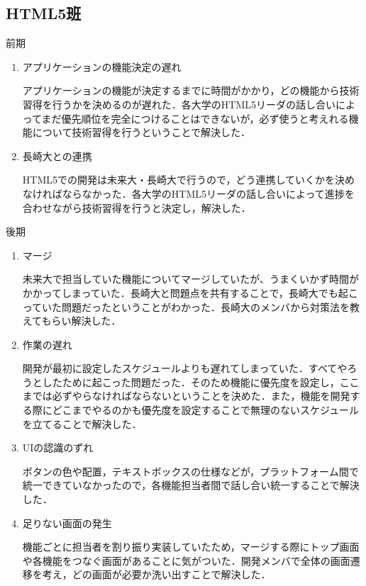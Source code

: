 \subsection{HTML5班}
前期
\\
\begin{enumerate}
\item アプリケーションの機能決定の遅れ
\par
アプリケーションの機能が決定するまでに時間がかかり，どの機能から技術習得を行うかを決めるのが遅れた．各大学のHTML5リーダの話し合いによってまだ優先順位を完全につけることはできないが，必ず使うと考えれる機能について技術習得を行うということで解決した．
\item 長崎大との連携
\par
HTML5での開発は未来大・長崎大で行うので，どう連携していくかを決めなければならなかった．各大学のHTML5リーダの話し合いによって進捗を合わせながら技術習得を行うと決定し，解決した．
\end{enumerate}
\par
\par
後期
\par
\begin{enumerate}
\item マージ
\par
未来大で担当していた機能についてマージしていたが、うまくいかず時間がかかってしまっていた．長崎大と問題点を共有することで，長崎大でも起こっていた問題だったということがわかった．長崎大のメンバから対策法を教えてもらい解決した．
\item 作業の遅れ
\par
開発が最初に設定したスケジュールよりも遅れてしまっていた．すべてやろうとしたために起こった問題だった．そのため機能に優先度を設定し，ここまでは必ずやらなければならないということを決めた．また，機能を開発する際にどこまでやるのかも優先度を設定することで無理のないスケジュールを立てることで解決した．
\item UIの認識のずれ
\par
ボタンの色や配置，テキストボックスの仕様などが，プラットフォーム間で統一できていなかったので，各機能担当者間で話し合い統一することで解決した．
\item 足りない画面の発生
\par 
機能ごとに担当者を割り振り実装していたため，マージする際にトップ画面や各機能をつなぐ画面があることに気がついた．開発メンバで全体の画面遷移を考え，どの画面が必要か洗い出すことで解決した．
\end{enumerate}
